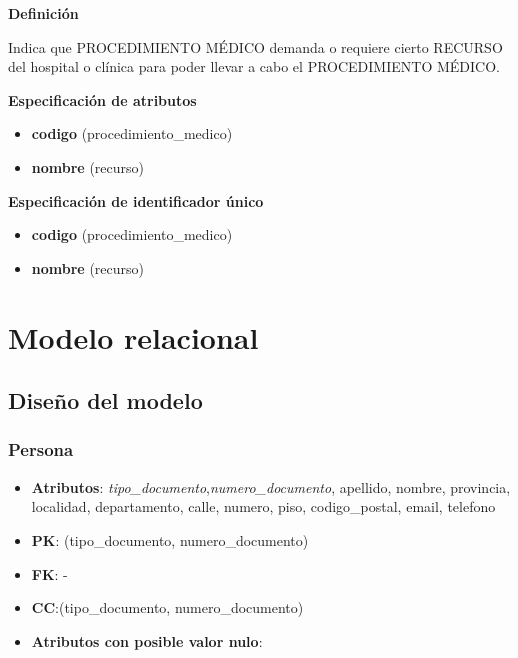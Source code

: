 \documentclass[a4paper,11pt]{article}
\begin{document}
\textbf{Definición}

Indica que PROCEDIMIENTO MÉDICO demanda o requiere cierto RECURSO del hospital o clínica
para poder llevar a cabo el PROCEDIMIENTO MÉDICO.

\textbf{Especificación de atributos}


\begin{itemize}
     \item \textbf{codigo} (procedimiento\_medico)

     \item \textbf{nombre} (recurso)

\end{itemize}

\textbf{Especificación de identificador único}

\begin{itemize}

     \item \textbf{codigo} (procedimiento\_medico)

     \item \textbf{nombre} (recurso)

\end{itemize}

\newpage

\section{\textbf{Modelo relacional\label{HToc293405831}}}

\subsection{\textbf{Diseño del modelo\label{HToc293405832}}}

\subsubsection{\textbf{Persona}}

\begin{itemize}

\item 
\textbf{Atributos}: \emph{tipo\_documento},\emph{numero\_documento}, apellido, nombre, provincia, localidad, departamento, calle, numero, piso, codigo\_postal, email, telefono

\item 
\textbf{PK}: (tipo\_documento, numero\_documento)

\item
\textbf{FK}: -

\item 
\textbf{CC}:(tipo\_documento, numero\_documento)

\item 
\textbf{Atributos con posible valor nulo}: 
\end{itemize}
\end{document}
